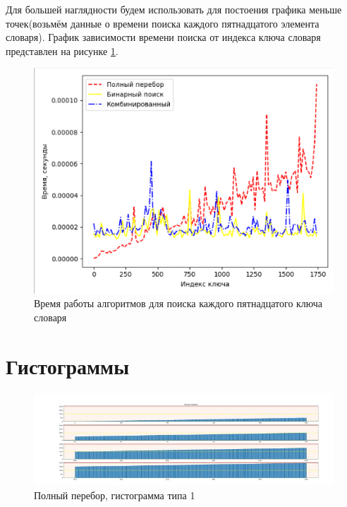 \documentclass[12pt]{report}
\begin{document}
\newpage
 Для большей наглядности будем использовать для постоения графика меньше точек(возьмём данные о времени поиска каждого пятнадцатого элемента словаря). График зависимости времени поиска от индекса ключа словаря представлен на рисунке \ref{fig:time2}.

\begin{figure}[h]
	\begin{center}
		\includegraphics[scale=0.55]{time2.png}
		\caption{Время работы алгоритмов для поиска каждого пятнадцатого ключа словаря}
		\label{fig:time2}
	\end{center}
\end{figure}

\clearpage
\newpage

\section{Гистограммы}

\begin{figure}[h]
	\begin{center}
		\includegraphics[scale=1]{gist1.jpg}
		\caption{Полный перебор, гистограмма типа 1}
		\label{fig:full}
	\end{center}
\end{figure}
\end{document}
